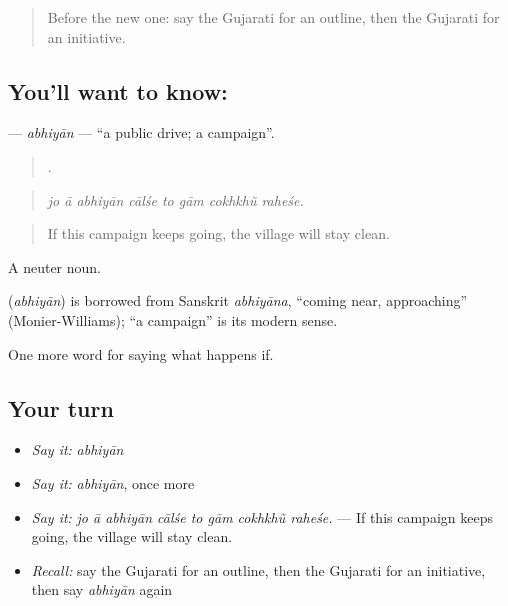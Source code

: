 \label{lesson:GU-C388-abhiyan}



\begin{quote}
Before the new one: say the Gujarati for an outline, then the Gujarati for an initiative.
\end{quote}

\subsection*{You'll want to know: }
\textbf{} — \emph{abhiyān} — \textquotedblleft{}a public drive; a campaign\textquotedblright{}.

\begin{quote}
       .
\end{quote}

\begin{quote}
\emph{jo ā abhiyān cālśe to gām cokhkhũ raheśe.}
\end{quote}

\begin{quote}
If this campaign keeps going, the village will stay clean.
\end{quote}

A neuter noun.

\begin{cousinweb}
\textbf{} (\emph{abhiyān}) is borrowed from Sanskrit \emph{abhiyāna}, \textquotedblleft{}coming near, approaching\textquotedblright{} (Monier-Williams); \textquotedblleft{}a campaign\textquotedblright{} is its modern sense.
\end{cousinweb}

\begin{grammarlens}[title={What you've built}]
One more word for saying what happens if.
\end{grammarlens}

\subsection*{Your turn}
\begin{itemize}
\raggedright
  \item \emph{Say it:} \emph{abhiyān}
  \item \emph{Say it:} \emph{abhiyān}, once more
  \item \emph{Say it:} \emph{jo ā abhiyān cālśe to gām cokhkhũ raheśe.} — If this campaign keeps going, the village will stay clean.
  \item \emph{Recall:} say the Gujarati for an outline, then the Gujarati for an initiative, then say \emph{abhiyān} again
\end{itemize}

